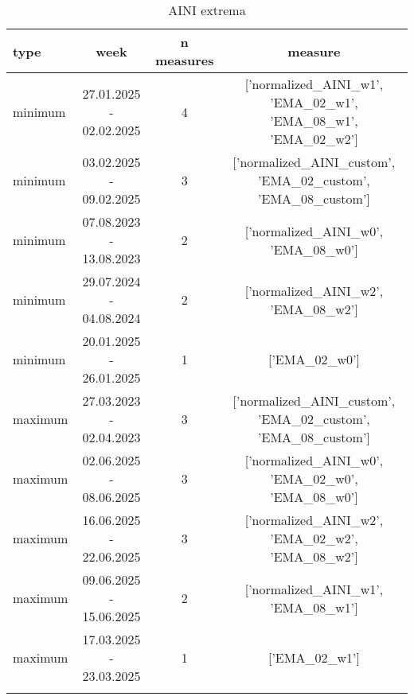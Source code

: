 \begin{table}[!htbp]
\centering
\begin{adjustbox}{width=\textwidth}
\begin{tabular}{lccc}
\toprule
\addlinespace
type & week & n measures & measure \\
\midrule
\addlinespace
minimum & 27.01.2025 - 02.02.2025 & 4 & ['normalized_AINI_w1', 'EMA_02_w1', 'EMA_08_w1', 'EMA_02_w2'] \\
minimum & 03.02.2025 - 09.02.2025 & 3 & ['normalized_AINI_custom', 'EMA_02_custom', 'EMA_08_custom'] \\
minimum & 07.08.2023 - 13.08.2023 & 2 & ['normalized_AINI_w0', 'EMA_08_w0'] \\
minimum & 29.07.2024 - 04.08.2024 & 2 & ['normalized_AINI_w2', 'EMA_08_w2'] \\
minimum & 20.01.2025 - 26.01.2025 & 1 & ['EMA_02_w0'] \\
maximum & 27.03.2023 - 02.04.2023 & 3 & ['normalized_AINI_custom', 'EMA_02_custom', 'EMA_08_custom'] \\
maximum & 02.06.2025 - 08.06.2025 & 3 & ['normalized_AINI_w0', 'EMA_02_w0', 'EMA_08_w0'] \\
maximum & 16.06.2025 - 22.06.2025 & 3 & ['normalized_AINI_w2', 'EMA_02_w2', 'EMA_08_w2'] \\
maximum & 09.06.2025 - 15.06.2025 & 2 & ['normalized_AINI_w1', 'EMA_08_w1'] \\
maximum & 17.03.2025 - 23.03.2025 & 1 & ['EMA_02_w1'] \\
\addlinespace
\bottomrule
\end{tabular}
\end{adjustbox}
\caption{AINI extrema}
\label{tab:aini_extrema}
\end{table}
